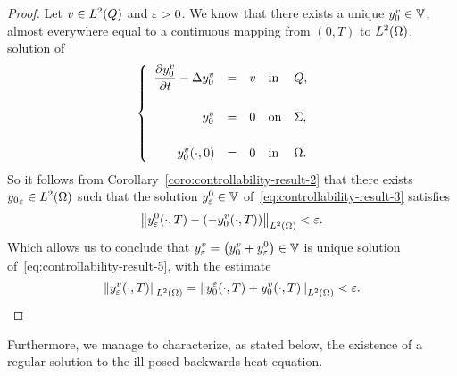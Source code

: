 \begin{proof}%
    Let $v\in L^{2}\!\left({Q}\right)$ and $\varepsilon > 0$. We know that there exists a unique
    $y_{0}^{v}\in \mathbb{V}$, almost everywhere equal to a continuous mapping
    from $(0,T)$ to $L^{2}\!\left({\Omega}\right)$, solution of
    \begin{equation*}\label{eq:controllability-proof-39}
        \begin{cases}\displaystyle
            \begin{array}{rclll}
                \dfrac{\partial{}y_{0}^{v}}{\partial{}t} - \Delta y_{0}^{v} & = & v &
                \text{in} & Q,\\
                \\
                y_{0}^{v} & = & 0 & \text{on} & \Sigma,\\
                \\
                y_{0}^{v}\!\left({\cdot,0}\right) & = & 0 & \text{in} &
                \Omega.
            \end{array}
        \end{cases}
    \end{equation*}
    So it follows from Corollary~\ref{coro:controllability-result-2} that
    there exists ${y_{0}}_{\varepsilon}\in L^{2}\!\left({\Omega}\right)$ such that the solution
    $y_{\varepsilon}^{0}\in \mathbb{V}$ of~\eqref{eq:controllability-result-3}
    satisfies
    \begin{equation*}\label{eq:controllability-proof-40}
        \normeohm{%
            y_{\veps}^{0}\!\left({\cdot,T}\right) - \left({%
                -y_{0}^{v}\!\left({\cdot,T}\right)
            }\right)
        } < \veps.
    \end{equation*}
    Which allows us to conclude that $\displaystyle y_{\veps}^{v} =
    \left({%
        y_{0}^{v} + y_{\veps}^{0}
    }\right) \in \Vbb$ is unique solution
    of~\eqref{eq:controllability-result-5}, with the estimate
    \begin{equation*}
        \normeohm{y_{\veps}^{v}\!\left({\cdot,T}\right)} = \normeohm{%
            y_{0}^{\veps}\!\left({\cdot,T}\right) +
            y_{0}^{v}\!\left({\cdot,T}\right)
        } < \veps.
    \end{equation*}
\end{proof}

Furthermore, we manage to characterize, as stated below, the existence of a
regular solution to the ill-posed backwards heat equation.

